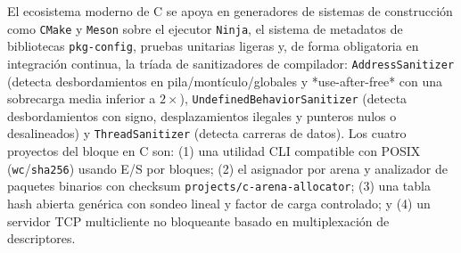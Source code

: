 \documentclass{book}
\begin{document}
El ecosistema moderno de C se apoya en generadores de sistemas de construcción como \texttt{CMake} y \texttt{Meson} sobre el ejecutor \texttt{Ninja}, el sistema de metadatos de bibliotecas \texttt{pkg-config}, pruebas unitarias ligeras y, de forma obligatoria en integración continua, la tríada de sanitizadores de compilador: \texttt{AddressSanitizer} (detecta desbordamientos en pila/montículo/globales y *use-after-free* con una sobrecarga media inferior a \(2\times\)), \texttt{UndefinedBehaviorSanitizer} (detecta desbordamientos con signo, desplazamientos ilegales y punteros nulos o desalineados) y \texttt{ThreadSanitizer} (detecta carreras de datos). Los cuatro proyectos del bloque en C son: (1) una utilidad CLI compatible con POSIX (\texttt{wc}/\texttt{sha256}) usando E/S por bloques; (2) el asignador por arena y analizador de paquetes binarios con checksum \texttt{projects/c-arena-allocator}; (3) una tabla hash abierta genérica con sondeo lineal y factor de carga controlado; y (4) un servidor TCP multicliente no bloqueante basado en multiplexación de descriptores.
\end{document}
